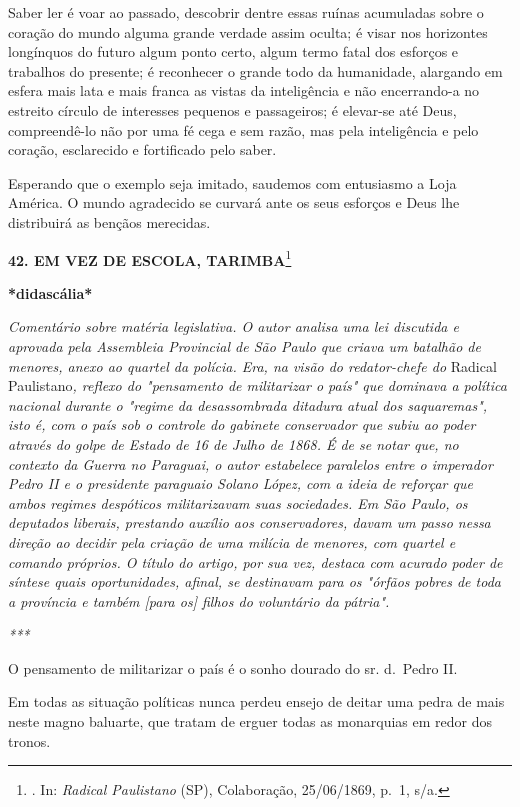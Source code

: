 Saber ler é voar ao passado, descobrir dentre essas ruínas acumuladas
sobre o coração do mundo alguma grande verdade assim oculta; é visar nos
horizontes longínquos do futuro algum ponto certo, algum termo fatal dos
esforços e trabalhos do presente; é reconhecer o grande todo da
humanidade, alargando em esfera mais lata e mais franca as vistas da
inteligência e não encerrando-a no estreito círculo de interesses
pequenos e passageiros; é elevar-se até Deus, compreendê-lo não por uma
fé cega e sem razão, mas pela inteligência e pelo coração, esclarecido e
fortificado pelo saber.

Esperando que o exemplo seja imitado, saudemos com entusiasmo a Loja
América. O mundo agradecido se curvará ante os seus esforços e Deus lhe
distribuirá as bençãos merecidas.

\textbf{42. EM VEZ DE ESCOLA, TARIMBA}\footnote{. In: \emph{Radical
  Paulistano} (SP), Colaboração, 25/06/1869, p.~1, s/a.}

\textbf{*didascália*}

\emph{Comentário sobre matéria legislativa. O autor analisa uma lei
discutida e aprovada pela Assembleia Provincial de São Paulo que criava
um batalhão de menores, anexo ao quartel da polícia. Era, na visão do
redator-chefe do} Radical Paulistano\emph{, reflexo do "pensamento de
militarizar o país" que dominava a política nacional durante o "regime
da desassombrada ditadura atual dos saquaremas", isto é, com o país sob
o controle do gabinete conservador que subiu ao poder através do golpe
de Estado de 16 de Julho de 1868. É de se notar que, no contexto da
Guerra no Paraguai, o autor estabelece paralelos entre o imperador Pedro
II e o presidente paraguaio Solano López, com a ideia de reforçar que
ambos regimes despóticos militarizavam suas sociedades. Em São Paulo, os
deputados liberais, prestando auxílio aos conservadores, davam um passo
nessa direção ao decidir pela criação de uma milícia de menores, com
quartel e comando próprios. O título do artigo, por sua vez, destaca com
acurado poder de síntese quais oportunidades, afinal, se destinavam para
os "órfãos pobres de toda a província e também {[}para os{]} filhos do
voluntário da pátria".}

\emph{***}

O pensamento de militarizar o país é o sonho dourado do sr. d.~Pedro II.

Em todas as situação políticas nunca perdeu ensejo de deitar uma pedra
de mais neste magno baluarte, que tratam de erguer todas as monarquias
em redor dos tronos.

